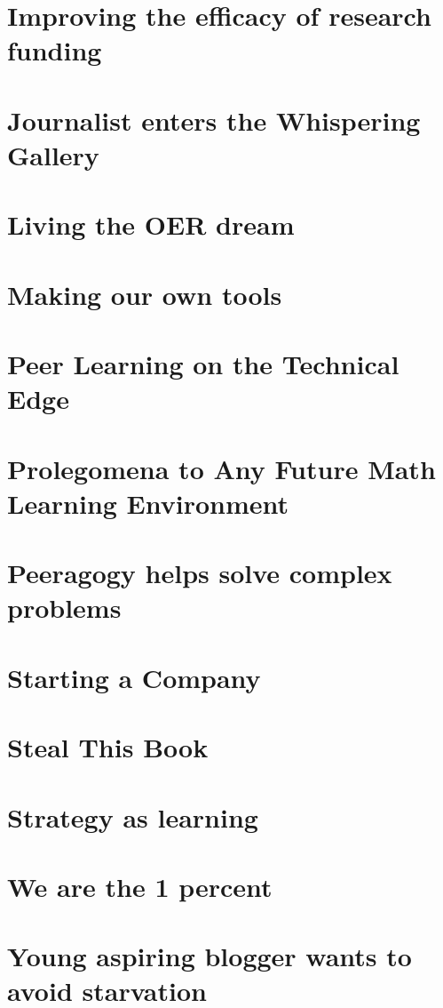\documentclass[ebook, 12pt, twoside]{memoir}
\begin{document}
\section*{Improving the efficacy of research funding}

\section*{Journalist enters the Whispering Gallery}

\section*{Living the OER dream}

\section*{Making our own tools}

\section*{Peer Learning on the Technical Edge}

\section*{Prolegomena to Any Future Math Learning Environment}

\section*{Peeragogy helps solve complex problems}

\section*{Starting a Company}

\section*{Steal This Book}

\section*{Strategy as learning}

\section*{We are the 1 percent}

\section*{Young aspiring blogger wants to avoid starvation}

\end{document}
